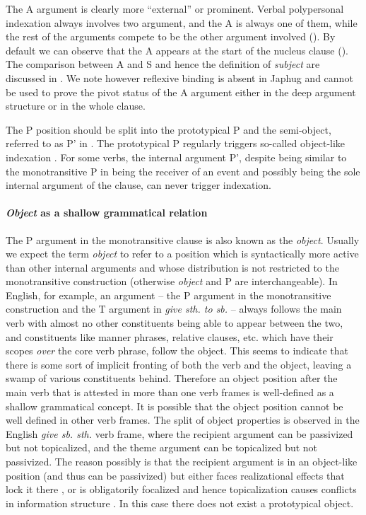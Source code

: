 \documentclass[a4paper, oneside, 12pt]{report}
\newcommand*{\citesec}[1]{\S~{#1}}
\newcommand*{\citepage}[1]{p.~{#1}}
\newcommand*{\term}[1]{\emph{#1}}
\newcommand{\form}[1]{\emph{#1}}
\begin{document}
The A argument is clearly more ``external'' or prominent.
Verbal polypersonal indexation always involves two argument,
and the A is always one of them, 
while the rest of the arguments compete to be the other argument involved 
().
By default we can observe that the A 
appears at the start of the nucleus clause 
().
The comparison between A and S and hence the definition of \term{subject}
are discussed in .
We note however reflexive binding is absent in Japhug
\citep[\citepage{543}]{jacques2021grammar}
and cannot be used to prove the pivot status of the A argument
either in the deep argument structure or in the whole clause.

The P position should be split into the prototypical P
and the semi-object, referred to as P' in \citet{jacques2016subjects}.
The prototypical P regularly triggers so-called object-like indexation
\citep[\citesec{8.1.3}, \citepage{543}]{jacques2021grammar}.
For some verbs, the internal argument P',
despite being similar to the monotransitive P in being the receiver of an event 
and possibly being the sole internal argument of the clause,
can never trigger indexation.

\paragraph*{\term{Object} as a shallow grammatical relation}
\label{sec:grammatical.clause.internal.object}
The P argument in the monotransitive clause is also known as the \term{object}.
Usually we expect the term \term{object} to refer to a position 
which is syntactically more active than other internal arguments
and whose distribution is not restricted to the monotransitive construction
(otherwise \term{object} and P are interchangeable).
In English, for example,
an argument -- the P argument in the monotransitive construction 
and the T argument in \form{give sth. to sb.} --
always follows the main verb with almost no other constituents
being able to appear between the two,
and constituents like manner phrases, relative clauses, etc.
which have their scopes \emph{over} the core verb phrase, follow the object.
This seems to indicate that there is some sort of implicit fronting 
of both the verb and the object,
leaving a swamp of various constituents behind.
Therefore an object position after the main verb
that is attested in more than one verb frames is well-defined
as a shallow grammatical concept.
It is possible that the object position cannot be well defined in other verb frames. 
The split of object properties is observed in the English \form{give sb. sth.} verb frame,
where the recipient argument can be passivized but not topicalized,
and the theme argument can be topicalized but not passivized.
The reason possibly is that the recipient argument is in an object-like position
(and thus can be passivized)
but either faces realizational effects that lock it there 
\citep{oba2005double},
or is obligatorily focalized and hence topicalization causes conflicts in information structure
\citep{im2005alternative}.
In this case there does not exist a prototypical object.
\end{document}
